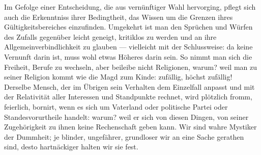 Im Gefolge einer Entscheidung, die aus vernünftiger Wahl hervorging, pflegt sich auch die Erkenntniss ihrer Bedingtheit, das Wissen um die Grenzen ihres Gültigkeitsbereiches einzufinden. Umgekehrt ist man den Sprüchen und Würfen des Zufalls gegenüber leicht geneigt, kritiklos zu werden und an ihre Allgemeinverbindlichkeit zu glauben — vielleicht mit der Schlussweise: da keine Vernunft darin ist, muss wohl etwas Höheres darin sein. So nimmt man sich die Freiheit, Berufe zu wechseln, aber beileibe nicht Religionen, warum? weil man zu seiner Religion kommt wie die Magd zum Kinde: zufällig, höchst zufällig! Derselbe Mensch, der im Übrigen sein Verhalten dem Einzelfall anpasst und mit der Relativität aller Interessen und Standpunkte rechnet, wird plötzlich fromm, feierlich, bornirt, wenn es sich um Vaterland oder politische Partei oder Standesvorurtheile handelt: warum? weil er sich von diesen Dingen, von seiner Zugehörigkeit zu ihnen keine Rechenschaft geben kann. Wir sind wahre Mystiker der Dummheit; je blinder, ungefährer, grundloser wir an eine Sache gerathen sind, desto hartnäckiger halten wir sie fest.
\par

